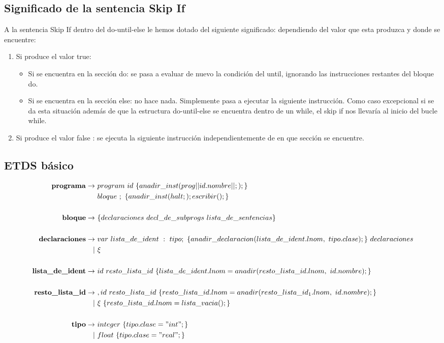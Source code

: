 \documentclass[12pt,a4paper, landscape]{article}
\theoremstyle{mytheor}
\begin{document}
\subsection{Significado de la sentencia Skip If}
A la sentencia Skip If dentro del do-until-else le hemos dotado del siguiente significado: dependiendo del valor que esta produzca y donde se encuentre:
\begin{enumerate}
\item Si produce el valor true:
    \begin{itemize}
    \item Si se encuentra en la sección do: se pasa a evaluar de nuevo la condición del until, ignorando las instrucciones restantes del bloque do.
    \item Si se encuentra en la sección else: no hace nada. Simplemente pasa a ejecutar la siguiente instrucción. Como caso excepcional si se da esta situación además de que la estructura do-until-else se encuentra dentro de un while, el skip if nos llevaría al inicio del bucle while.
    \end{itemize}
\item Si produce el valor false : se ejecuta la siguiente instrucción independientemente de en que sección se encuentre.
\end{enumerate}


\subsection{ETDS básico}
\begin{center}
  \begin{align*}
    \text{\textbf{programa}} \to\ & program\ id\ \{ anadir\_inst( prog|| id.nombre || ;); \}\\
    & bloque\  ;\  \{ anadir\_inst(halt; ); escribir();\}\\\\
    \text{\textbf{ bloque}} \to\ &\{ declaraciones\ decl\_de\_subprogs\ lista\_de\_sentencias \}\\\\
    \text{\textbf{declaraciones}} \to\ & var\ lista\_de\_ident\ :\ tipo;\ \{ anadir\_declaracion(lista\_de\_ident.lnom,\ tipo.clase);\}\ declaraciones\\
    |\ &\xi\\\\
    \text{\textbf{lista\_de\_ident}} \to\ & id\ resto\_lista\_id\ \{lista\_de\_ident.lnom=anadir(resto\_lista\_id.lnom,\ id.nombre);\}\\\\
    \text{\textbf{ resto\_lista\_id}} \to\ & ,id\ resto\_lista\_id\  \{resto\_lista\_id.lnom=anadir(resto\_lista\_id_1.lnom,\ id.nombre);\} \\
    |\ &\xi\ \{resto\_lista\_id.lnom=lista\_vacia();\}\\\\
     \text{\textbf{tipo}} \to\ & integer\ \{tipo.clase="int"; \}\\
    |\ & float\ \{tipo.clase="real"; \}\\\\
  \end{align*}
\end{center}
\end{document}
